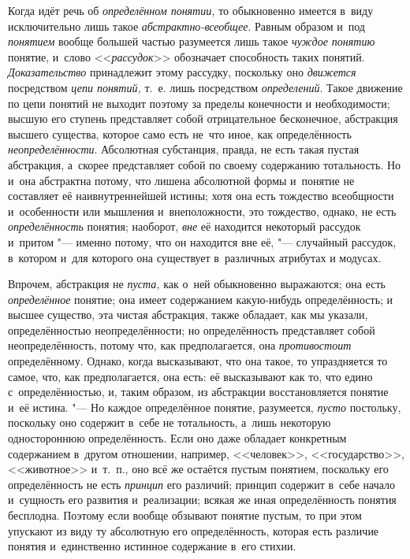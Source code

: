 Когда идёт речь об {\em определённом понятии,}
то обыкновенно имеется в~виду исключительно лишь такое
{\em абстрактно-всеобщее}. Равным образом и~под
{\em понятием} вообще большей частью разумеется лишь такое
{\em чуждое понятию} понятие, и~слово <<{\em рассудок}>>
обозначает способность таких понятий. {\em Доказательство}
принадлежит этому рассудку, поскольку оно {\em движется}
посредством {\em цепи понятий,} т.~е. лишь посредством {\em определений}.
Такое движение по цепи понятий не выходит поэтому за пределы конечности и
необходимости; высшую его ступень представляет собой отрицательное
бесконечное, абстракция высшего существа, которое само есть не~что иное,
как определённость {\em неопределённости}.
Абсолютная субстанция, правда, не есть такая пустая
абстракция, а~скорее представляет собой по своему содержанию тотальность.
Но и~она абстрактна потому, что лишена абсолютной формы и~понятие не
составляет её наивнутреннейшей истины; хотя она есть тождество всеобщности
и~особенности или мышления и~внеположности, это тождество,
однако, не есть {\em определённость} понятия; наоборот, {\em вне} её находится
некоторый рассудок и~притом "--- именно потому, что он
находится вне её, "--- случайный рассудок, в~котором и~для
которого она существует в~различных атрибутах и
модусах.

Впрочем, абстракция не {\em пуста,} как о~ней
обыкновенно выражаются; она есть {\em определённое}
понятие; она имеет содержанием какую-нибудь определённость; и
высшее существо, эта чистая абстракция, также обладает, как мы указали,
определённостью неопределённости; но определённость представляет собой
неопределённость, потому что, как предполагается, она {\em противостоит}
определённому. Однако, когда высказывают, что она такое, то
упраздняется то самое, что, как предполагается, она есть: её высказывают
как то, что едино с~определённостью, и, таким образом, из абстракции
восстановляется понятие и~её истина. "--- Но каждое
определённое понятие, разумеется, {\em пусто} постольку,
поскольку оно содержит в~себе не тотальность, а~лишь некоторую одностороннюю
определённость. Если оно даже обладает конкретным содержанием в~другом
отношении, например, <<человек>>, <<государство>>, <<животное>> и~т.~п.,
оно всё же остаётся пустым понятием, поскольку его определённость не есть
{\em принцип} его различий; принцип содержит в~себе начало и~сущность его
развития и~реализации; всякая же иная определённость понятия бесплодна. Поэтому
если вообще обзывают понятие пустым, то при этом упускают из виду ту абсолютную
его определённость, которая есть различие понятия и~единственно истинное
содержание в~его стихии.


